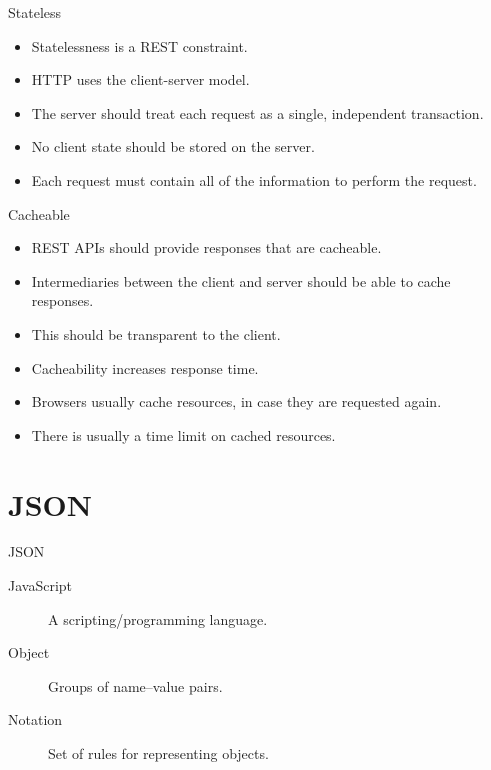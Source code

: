 \begin{frame}{Stateless}
  \begin{itemize}
    \item Statelessness is a REST constraint.
    \item HTTP uses the client-server model.
    \item The server should treat each request as a single, independent transaction.
    \item No client state should be stored on the server.
    \item Each request must contain all of the information to perform the request. 
  \end{itemize}
\end{frame}

\begin{frame}{Cacheable}
  \begin{itemize}
    \item REST APIs should provide responses that are cacheable.
    \item Intermediaries between the client and server should be able to cache responses.
    \item This should be transparent to the client.
    \item Cacheability increases response time.
    \item Browsers usually cache resources, in case they are requested again.
    \item There is usually a time limit on cached resources.
  \end{itemize}
\end{frame}



\section{JSON}

\begin{frame}{JSON}
  \begin{description}
    \item[JavaScript] A scripting/programming language.
    \vspace{0.25cm}
    \item[Object] Groups of name--value pairs.
    \vspace{0.25cm}
    \item[Notation] Set of rules for representing objects.
  \end{description}
\end{frame}

